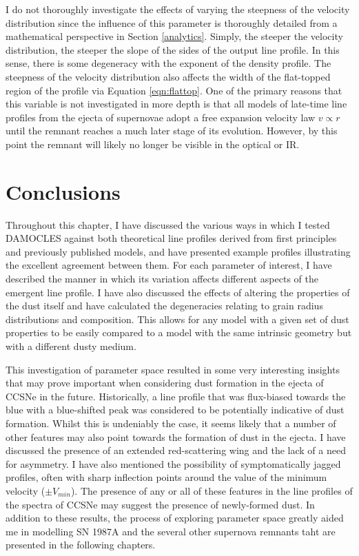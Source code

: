 \label{scn:vel_prof}

I do not thoroughly investigate the effects of varying the steepness of the velocity distribution since the influence of this parameter is thoroughly detailed from a mathematical perspective in Section \ref{analytics}.  Simply, the steeper the velocity distribution, the steeper the slope of the sides of the output line profile.  In this sense, there is some degeneracy with the exponent of the density profile.  The steepness of the velocity distribution also affects the width of the flat-topped region of the profile via Equation \ref{eqn:flattop}.  One of the primary reasons that this variable is not investigated in more depth is that all models of late-time line profiles from the ejecta of supernovae adopt a free expansion velocity law $v \propto r$ until the remnant reaches a much later stage of its evolution.  However, by this point the remnant will likely no longer be visible in the optical or IR.

\section{Conclusions}

Throughout this chapter, I have discussed the various ways in which I tested DAMOCLES against both theoretical line profiles derived from first principles and previously published models, and have presented example profiles illustrating the excellent agreement between them.  For each parameter of interest, I have described the manner in which its variation affects different aspects of the emergent line profile.  I have also discussed the effects of altering the properties of the dust itself and have calculated the degeneracies relating to grain radius distributions and composition.  This allows for any model with a given set of dust properties to be easily compared to a model with the same intrinsic geometry but with a different dusty medium.  

This investigation of parameter space resulted in some very interesting insights that may prove important when considering dust formation in the ejecta of CCSNe in the future.  Historically,  a line profile that was flux-biased towards the blue with a blue-shifted peak was considered to be potentially indicative of dust formation.  Whilst this is undeniably the case, it seems likely that a number of other features may also point towards the formation of dust in the ejecta.  I have discussed the presence of an extended red-scattering wing and the lack of a need for asymmetry.  I have also mentioned the possibility of symptomatically jagged profiles, often with sharp inflection points around the value of the minimum velocity ($\pm V_{min}$).  The presence of any or all of these features in the line profiles of the spectra of CCSNe may suggest the presence of newly-formed dust.  In addition to these results, the process of exploring parameter space greatly aided me in modelling SN 1987A and the several other supernova remnants taht are presented in the following chapters.






